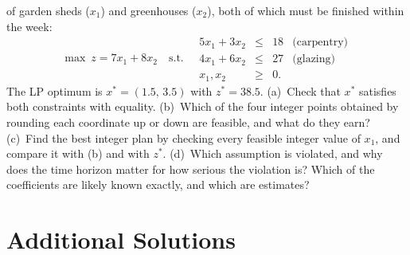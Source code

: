 \begin{problems}
        of garden sheds ($x_1$) and greenhouses ($x_2$), both of which must
        be finished within the week:
        \[
          \max\ z=7x_1+8x_2
          \quad\text{s.t.}\quad
          \begin{array}{rcll}
            5x_1+3x_2 &\le& 18 & \text{(carpentry)}\\
            4x_1+6x_2 &\le& 27 & \text{(glazing)}\\
            x_1,x_2 &\ge& 0 .
          \end{array}
        \]
        The LP optimum is $x^{*}=(1.5,\,3.5)$ with $z^{*}=38.5$.
        (a)~Check that $x^{*}$ satisfies both constraints with equality.
        (b)~Which of the four integer points obtained by rounding each
        coordinate up or down are feasible, and what do they earn?
        (c)~Find the best integer plan by checking every feasible integer
        value of $x_1$, and compare it with (b) and with $z^{*}$.
        (d)~Which assumption is violated, and why does the time horizon
        matter for how serious the violation is? Which of the
        coefficients are likely known exactly, and which are estimates?
\end{problems}

\section{Additional Solutions}

